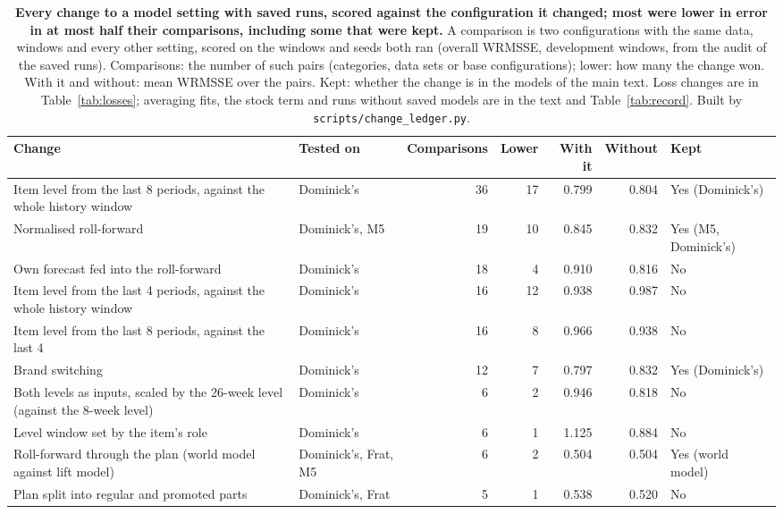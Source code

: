 \begin{table}[t]
\centering
\caption{\textbf{Every change to a model setting with saved runs, scored against the configuration it changed;
most were lower in error in at most half their comparisons, including some that were kept.} A comparison is two
configurations with the same data, windows and every other setting, scored on the windows and seeds both ran
(overall WRMSSE, development windows, from the audit of the saved runs). Comparisons: the number of such pairs
(categories, data sets or base configurations); lower: how many the change won. With it and without: mean WRMSSE
over the pairs. Kept: whether the change is in the models of the main text. Loss changes are in
Table~\ref{tab:losses}; averaging fits, the stock term and runs without saved models are in the text and
Table~\ref{tab:record}. Built by \texttt{scripts/change\_ledger.py}.}
\label{tab:changes}
\footnotesize
\begin{tabular}{p{}p{}rrrrl}
\toprule
\textbf{Change} & \textbf{Tested on} & \textbf{Comparisons} & \textbf{Lower} & \textbf{With it} &
\textbf{Without} & \textbf{Kept} \\
\midrule
Item level from the last 8 periods, against the whole history window & Dominick's & 36 & 17 & 0.799 & 0.804 & Yes (Dominick's) \\
Normalised roll-forward & Dominick's, M5 & 19 & 10 & 0.845 & 0.832 & Yes (M5, Dominick's) \\
Own forecast fed into the roll-forward & Dominick's & 18 & 4 & 0.910 & 0.816 & No \\
Item level from the last 4 periods, against the whole history window & Dominick's & 16 & 12 & 0.938 & 0.987 & No \\
Item level from the last 8 periods, against the last 4 & Dominick's & 16 & 8 & 0.966 & 0.938 & No \\
Brand switching & Dominick's & 12 & 7 & 0.797 & 0.832 & Yes (Dominick's) \\
Both levels as inputs, scaled by the 26-week level (against the 8-week level) & Dominick's & 6 & 2 & 0.946 & 0.818 & No \\
Level window set by the item's role & Dominick's & 6 & 1 & 1.125 & 0.884 & No \\
Roll-forward through the plan (world model against lift model) & Dominick's, Frat, M5 & 6 & 2 & 0.504 & 0.504 & Yes (world model) \\
Plan split into regular and promoted parts & Dominick's, Frat & 5 & 1 & 0.538 & 0.520 & No \\

\end{tabular}
\end{table}
